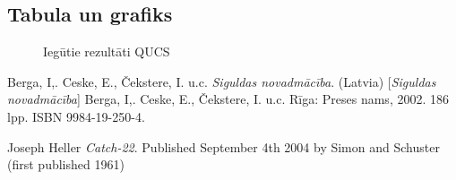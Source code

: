 \documentclass{report}
\begin{document}
    \subsection{Tabula un grafiks}
    \begin{figure}[h]
        \centering
        \caption{Iegūtie rezultāti QUCS}
        \label{fig:my_label5}
    \end{figure}
\begin{thebibliography}{9}
Berga, I,. Ceske, E., Čekstere, I. u.c. 
\textit{Siguldas novadmācība}. (Latvia) 
[\textit{Siguldas novadmācība}]
Berga, I,. Ceske, E., Čekstere, I. u.c. Rīga: Preses nams, 2002. 186 lpp. ISBN 9984-19-250-4.

Joseph Heller
\textit{Catch-22}. 
Published September 4th 2004 by Simon and Schuster (first published 1961)
\end{thebibliography}
\end{document}
